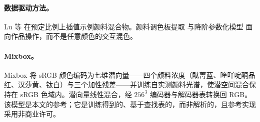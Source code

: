 \paragraph{数据驱动方法。}
Lu 等 \cite{lu2014} 在预定比例上插值示例颜料混合物。颜料调色板提取 \cite{aharoni2017,tan2019} 与降阶参数化模型 \cite{shugrina2020} 面向作品操作，而不是任意颜色的交互混色。

\paragraph{Mixbox。}
Mixbox \cite{sochorova2021} 将 sRGB 颜色编码为七维潜向量——四个颜料浓度（酞菁蓝、喹吖啶酮品红、汉莎黄、钛白）与三个加性残差——并训练自实测颜料光谱，使潜空间混合保持在 sRGB 色域内。潜向量线性混合，经 $256^{3}$ 编码器与解码器表转换回 RGB。该模型是本文的参考；它是训练得到的、基于查找表的，而非解析的，且参考实现采用非商业许可。
